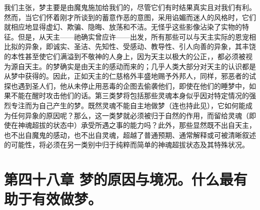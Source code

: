 我们主张，梦主要是由魔鬼施加给我们的，尽管它们有时结果真实且对我们有利。然而，当它们怀着刚才所谈到的蓄意作恶的意图，采用谄媚而迷人的风格时，它们就相应地显得虚幻、欺骗、隐晦、放荡和不洁。无怪乎这些影像沾染了实物的特征。但是，从天主——祂确实曾应许——出发，所有那些可以与天主实际的恩宠相比拟的异象，即诚实、圣洁、先知性、受感动、教导性、引人向善的异象，其丰饶的本性甚至使它们满溢到不敬神的人身上，因为天主以极大的公正，，都必须被视为源自天主。的梦确实是由天主的感动而来的；几乎人类大部分对天主的认识都是从梦中获得的。因此，正如天主的仁慈格外丰盛地赐予外邦人，同样，邪恶者的试探也遇到圣人们，他从未停止用恶毒的企图去偷袭他们，即使在他们的睡梦中，如果不能在醒时攻击他们的话。第三类梦将包括那些灵魂本身似乎因对特定情况的强烈专注而为自己产生的梦。既然灵魂不能自主地做梦（连也持此见），它如何能成为任何异象的原因呢？那么，这一类梦就必须被归于自然的作用，而留给灵魂（即使在神魂超拔的状态中）承受所遇之事的能力吗？此外，那些显然既不出自天主，也不出自魔鬼的感动，也不出自灵魂，超越了普通预期、通常解释或可被清晰叙述的可能性，将必须在另一类别中归于纯粹而简单的神魂超拔状态及其特殊状况。\par


\section{第四十八章 梦的原因与境况。什么最有助于有效做梦。}


